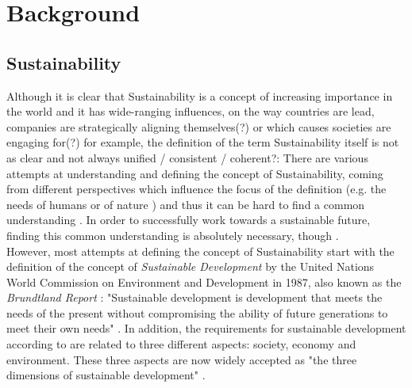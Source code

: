 \chapter{Background} %
\section{Sustainability}
Although it is clear that Sustainability is a concept of increasing importance in the world and it has wide-ranging influences, on the way countries are lead, companies are strategically aligning themselves(?) or which causes societies are engaging for(?) for example, the definition of the term Sustainability itself is not as clear and not always unified / consistent / coherent?: %
There are various attempts at understanding and defining the concept of Sustainability, coming from different perspectives which influence the focus of the definition (e.g. the needs of humans or of nature \cite{gladwin_shifting_1995}) and thus it can be hard to find a common understanding \cite{jamieson_sustainability_1998}%
. In order to successfully work towards a sustainable future, finding this common understanding is absolutely necessary, though \cite{jamieson_sustainability_1998}.\\

However, most attempts at defining the concept of Sustainability start with the definition of the concept of \textit{Sustainable Development} by the United Nations World Commission on Environment and Development in 1987, also known as the \textit{Brundtland Report} %
: "Sustainable development is development that meets the needs of the present without compromising the ability of future generations to meet their own needs"\cite{Brundtland1987} %
. In addition, the requirements for sustainable development according to \cite{Brundtland1987} are related to three different aspects: society, economy and environment. These three aspects are now widely accepted as "the three dimensions of sustainable development" \cite{UN_transform_15}.

